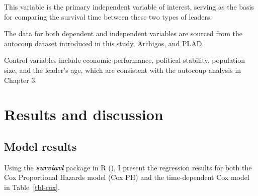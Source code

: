 \documentclass[
  12pt,
]{report}
\begin{document}
This variable is the primary independent variable of interest, serving
as the basis for comparing the survival time between these two types of
leaders.

The data for both dependent and independent variables are sourced from
the autocoup dataset introduced in this study, Archigos, and PLAD.

Control variables include economic performance, political stability,
population size, and the leader's age, which are consistent with the
autocoup analysis in Chapter 3.

\section{Results and discussion}\label{results-and-discussion}

\subsection{Model results}\label{model-results}

Using the \textbf{\emph{surviavl}} package in R
(), I present the regression
results for both the Cox Proportional Hazards model (Cox PH) and the
time-dependent Cox model in Table~\ref{tbl-cox}.
\end{document}
